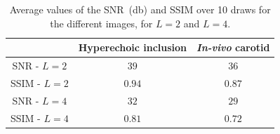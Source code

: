 \documentclass[9pt,conference]{IEEEtran}
\begin{document}
\newpage
\begin{table}[htb]
	\caption{Average values of the SNR~(\si{\decibel}) and SSIM over 10 draws for the different images, for $L = 2$ and $L = 4$.}
	\label{tab:SNR_SSIM}
	\centering
	\begin{tabular}{|c |c c|}
		\hline
		& Hyperechoic inclusion & \textit{In-vivo} carotid\\
		\hline
		SNR - $L = 2$ & $39$ & $36$\\
		SSIM - $L = 2$ & $0.94$ & $0.87$\\
		SNR - $L = 4$ & $32$ & $29$ \\
		SSIM - $L = 4$ & $0.81$ & $0.72$\\
		\hline
	\end{tabular}
\end{table} 




%




\end{document}
